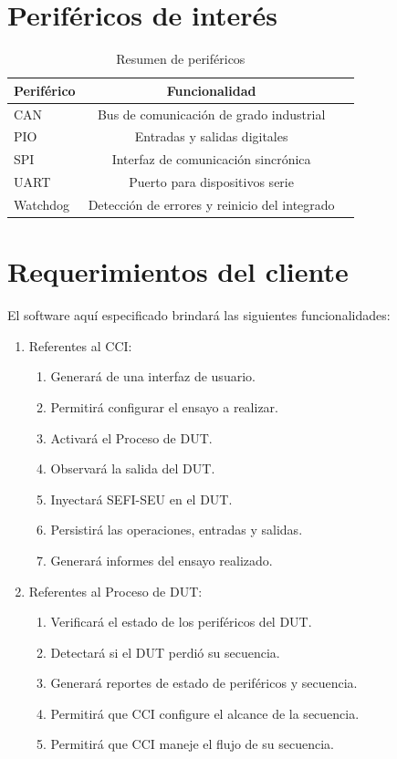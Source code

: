 \section{Periféricos de interés}
\label{sec:perifericos}

\begin{table}[h]
	\centering
	\caption[Resumen de periféricos]{Resumen de periféricos}
	\begin{tabular}{l c c}    
		\toprule
        \textbf{Periférico} & \textbf{Funcionalidad}\\
		\midrule
		CAN                 & Bus de comunicación de grado industrial\\        	
		PIO                 & Entradas y salidas digitales\\
		SPI                 & Interfaz de comunicación sincrónica\\
		UART                & Puerto para dispositivos serie\\
		Watchdog            & Detección de errores y reinicio del integrado\\
		\bottomrule
		\hline
	\end{tabular}
	\label{tab:perifericosresumen}
\end{table}

\section{Requerimientos del cliente}
\label{sec:emphuerimientos}

El software aquí especificado brindará las siguientes funcionalidades:

\begin{enumerate}
	\item Referentes al CCI:
		\begin{enumerate}
			\item Generará de una interfaz de usuario.
			\item Permitirá configurar el ensayo a realizar.
			\item Activará el Proceso de DUT.
			\item Observará la salida del DUT.
			\item Inyectará SEFI-SEU en el DUT.
			\item Persistirá las operaciones, entradas y salidas.
			\item Generará informes del ensayo realizado.
		\end{enumerate}
	\item Referentes al Proceso de DUT:
		\begin{enumerate}
			\item Verificará el estado de los periféricos del DUT.
			\item Detectará si el DUT perdió su secuencia.
			\item Generará reportes de estado de periféricos y secuencia.
			\item Permitirá que CCI configure el alcance de la secuencia.
			\item Permitirá que CCI maneje el flujo de su secuencia.
		\end{enumerate}
\end{enumerate}

